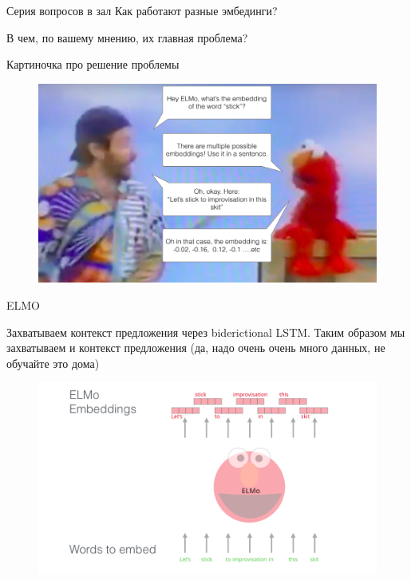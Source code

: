 \documentclass[notes,12pt, aspectratio=169]{beamer}
\begin{document}
\begin{frame}{Серия вопросов в зал}
Как работают разные эмбединги?

В чем, по вашему мнению, их главная проблема?
\end{frame}

\begin{frame}{Картиночка про решение проблемы}

\begin{figure}
	\centering
	\includegraphics[width=0.9\linewidth]{images/elmo-embedding-robin-williams}
	\label{fig:seq2seq}
\end{figure}
\end{frame}

\begin{frame}{ELMO}
	
Захватываем контекст предложения через biderictional LSTM. Таким образом мы захватываем и контекст предложения (да, надо очень очень много данных, не обучайте это дома)



\begin{figure}
	\centering
	\includegraphics[width=0.7\linewidth]{images/elmo-word-embedding}
	\label{fig:seq2seq}
\end{figure}
\end{frame}
\end{document}
